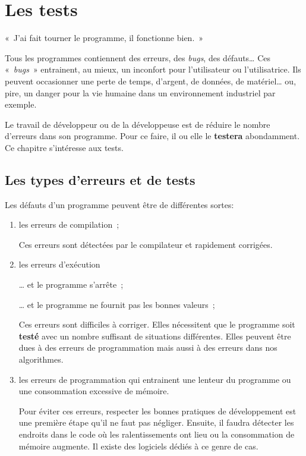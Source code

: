 \chapter{Les tests}
\label{chap:tests}

\begin{Exergue}
	«~J'ai fait tourner le programme, il fonctionne bien.~»
\end{Exergue}

Tous les programmes contiennent des erreurs, des \textit{bugs}, des défauts… Ces
«~\textit{bugs}~» entrainent, au mieux, un inconfort pour l'utilisateur ou
l'utilisatrice. Ils peuvent occasionner une perte de temps, d'argent, de
données, de matériel… ou, pire, un danger pour la vie humaine dans un
environnement industriel par exemple. 

Le travail de développeur ou de la développeuse est de réduire le nombre
d'erreurs dans son programme. Pour ce faire, il ou elle le \textbf{testera}
abondamment.  Ce chapitre s'intéresse aux tests. 

\minitoc


\section{Les types d'erreurs et de tests}

Les défauts d'un programme peuvent être de différentes sortes:

\begin{enumerate}
	
	\item les erreurs de compilation~;

		Ces erreurs sont détectées par le compilateur et rapidement corrigées.

	\item les erreurs d'exécution
		
		… et le programme s'arrête~;


		… et le programme ne fournit pas les bonnes valeurs~;

		Ces erreurs sont difficiles à corriger. Elles nécessitent
		que le programme soit \textbf{testé} avec un nombre suffisant de
		situations différentes. Elles peuvent être dues à des erreurs de
		programmation mais aussi à des erreurs dans nos algorithmes. 

	\item les erreurs de programmation qui entrainent une lenteur du programme 
		ou une consommation excessive de mémoire. 

		Pour éviter ces erreurs, respecter les bonnes pratiques de développement
		est une première étape qu'il ne faut pas négliger. Ensuite, il faudra
		détecter les endroits dans le code où les ralentissements ont lieu ou la
		consommation de mémoire augmente. Il existe des logiciels dédiés à ce
		genre de cas. 

\end{enumerate}

